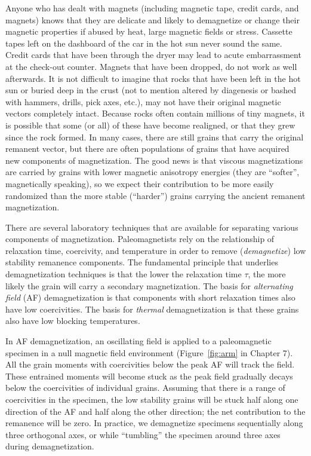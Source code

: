 Anyone who has dealt with magnets (including magnetic tape, credit
cards, and  magnets) knows that they are delicate and  likely to 
demagnetize or change their magnetic properties if abused by heat, large magnetic fields or stress. 
Cassette tapes left on the dashboard of the car in the hot sun never sound the
same.  Credit cards that have been through the dryer may lead to acute
embarrassment at the check-out counter.
 Magnets that have been dropped, do not work as well
afterwards.  It is not difficult to imagine  that rocks that have been
left in the hot sun or buried deep in the crust (not to mention 
altered by diagenesis  or 
 bashed with hammers, drills, pick axes, etc.), may not have their
original magnetic vectors completely intact.  Because rocks often
contain
millions of tiny magnets, it is possible that some (or all) of these have
become realigned, or that they 
grew since the rock formed.  In many cases, there are
still grains that carry the original remanent vector, but there are
often populations of grains that have acquired  new components of
magnetization. The good news is that
viscous magnetizations are carried by grains with  
 lower magnetic anisotropy energies (they are 
``softer'', magnetically speaking), so  we  expect 
their contribution to be more easily randomized than
the more stable (``harder'') grains carrying the ancient remanent
magnetization. 

There are several laboratory techniques that are available for
separating various components of magnetization. 
Paleomagnetists rely on the relationship of relaxation time, coercivity, and
temperature in order to remove ({\it demagnetize}) low stability remanence
components.  The
fundamental principle that underlies demagnetization techniques is that the lower
the relaxation time $\tau$, the more likely the grain will carry a secondary
magnetization.  The basis for 
{\it alternating field} (AF) demagnetization 
 is that components with short relaxation times also have low coercivities.
The basis  for
 {\it thermal} demagnetization is that these grains also
have low blocking temperatures.


In AF demagnetization,  an oscillating field is applied to a
paleomagnetic specimen in a null magnetic
field environment (Figure~\ref{fig:arm} in Chapter 7).  All the grain moments with
coercivities below the peak AF will track the field.  These entrained moments
will become stuck as the peak field gradually decays below the
coercivities of individual grains.   Assuming that there is a range of
coercivities in the specimen, the low stability grains will be stuck half along
one direction of the AF and half along the other direction; the net
contribution to the remanence will be zero. In practice, we
demagnetize specimens sequentially along three orthogonal axes, or
while ``tumbling'' the specimen around three axes during
demagnetization.


